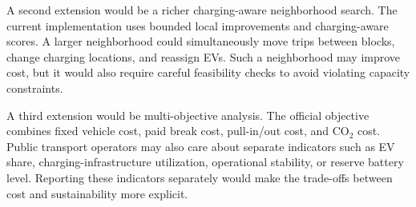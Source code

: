 A second extension would be a richer charging-aware neighborhood search.  The
current implementation uses bounded local improvements and charging-aware
scores.  A larger neighborhood could simultaneously move trips between blocks,
change charging locations, and reassign EVs.  Such a neighborhood may improve
cost, but it would also require careful feasibility checks to avoid violating
capacity constraints.

A third extension would be multi-objective analysis.  The official objective
combines fixed vehicle cost, paid break cost, pull-in/out cost, and CO\(_2\)
cost.  Public transport operators may also care about separate indicators such
as EV share, charging-infrastructure utilization, operational stability, or
reserve battery level.  Reporting these indicators separately would make the
trade-offs between cost and sustainability more explicit.
